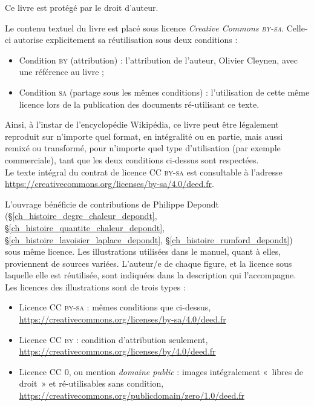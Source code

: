 {\setlength{\parindent}{0pt}
	Ce livre est protégé par le droit d’auteur.

	Le contenu textuel du livre est placé sous licence \textit{Creative Commons \textsc{by-sa}}. Celle-ci autorise explicitement sa réutilisation sous deux conditions : 
	\begin{itemize}
		\renewcommand\labelitemi{\ccAttribution}
		\item Condition \textsc{by} (attribution) : l’attribution de l’auteur, Olivier Cleynen, avec une référence au livre ;
		\renewcommand\labelitemi{\ccShareAlike}
		\item Condition \textsc{sa} (partage sous les mêmes conditions) : l’utilisation de cette même licence lors de la publication des documents ré-utilisant ce texte.
	\end{itemize}

	Ainsi, à l’instar de l’encyclopédie Wikipédia, ce livre peut être légalement reproduit sur n’importe quel format, en intégralité ou en partie, mais aussi remixé ou transformé, pour n’importe quel type d’utilisation (par exemple commerciale), tant que les deux conditions ci-dessus sont respectées.\\
	Le texte intégral du contrat de licence \textsc{CC by-sa} est consultable à l’adresse \onlyamphibook{\\}\href{https://creativecommons.org/licenses/by-sa/4.0/deed.fr}{https://creativecommons.org/licenses/by-sa/4.0/deed.fr}.

	L’ouvrage bénéficie de contributions de Philippe Depondt (\S\ref{ch_histoire_degre_chaleur_depondt}, \S\ref{ch_histoire_quantite_chaleur_depondt}, \S\ref{ch_histoire_lavoisier_laplace_depondt}, \S\ref{ch_histoire_rumford_depondt}) sous même licence. Les illustrations utilisées dans le manuel, quant à elles, proviennent de sources variées. L’auteur/e de chaque figure, et la licence sous laquelle elle est réutilisée, sont indiquées dans la description qui l’accompagne. Les licences des illustrations sont de trois types : 
	\begin{itemize}
		\item Licence \textsc{CC by-sa} : mêmes conditions que ci-dessus,\\
					\href{https://creativecommons.org/licenses/by-sa/4.0/deed.fr}{https://creativecommons.org/licenses/by-sa/4.0/deed.fr}
		\item Licence \textsc{CC by} : condition d’attribution seulement,\\
					\href{https://creativecommons.org/licenses/by/4.0/deed.fr}{https://creativecommons.org/licenses/by/4.0/deed.fr}
		\item Licence \textsc{CC 0}, ou mention \textit{domaine public} : images intégralement «~libres de droit~» et ré-utilisables sans condition,\\
					\href{https://creativecommons.org/publicdomain/zero/1.0/deed.fr}{https://creativecommons.org/publicdomain/zero/1.0/deed.fr}
	\end{itemize}

}
